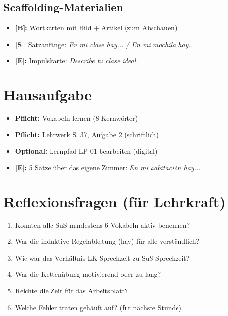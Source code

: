 \documentclass[11pt,a4paper]{article}
\begin{document}
\subsection{Scaffolding-Materialien}

\begin{itemize}
    \item \textbf{[B]:} Wortkarten mit Bild + Artikel (zum Abschauen)
    \item \textbf{[S]:} Satzanfänge: \textit{En mi clase hay... / En mi mochila hay...}
    \item \textbf{[E]:} Impulskarte: \textit{Describe tu clase ideal.}
\end{itemize}

\section{Hausaufgabe}

\begin{itemize}
    \item \textbf{Pflicht:} Vokabeln lernen (8 Kernwörter)
    \item \textbf{Pflicht:} Lehrwerk S. 37, Aufgabe 2 (schriftlich)
    \item \textbf{Optional:} Lernpfad LP-01 bearbeiten (digital)
    \item \textbf{[E]:} 5 Sätze über das eigene Zimmer: \textit{En mi habitación hay...}
\end{itemize}

\section{Reflexionsfragen (für Lehrkraft)}

\begin{enumerate}
    \item Konnten alle SuS mindestens 6 Vokabeln aktiv benennen?
    \item War die induktive Regelableitung (hay) für alle verständlich?
    \item Wie war das Verhältnis LK-Sprechzeit zu SuS-Sprechzeit?
    \item War die Kettenübung motivierend oder zu lang?
    \item Reichte die Zeit für das Arbeitsblatt?
    \item Welche Fehler traten gehäuft auf? (für nächste Stunde)
\end{enumerate}
\end{document}
